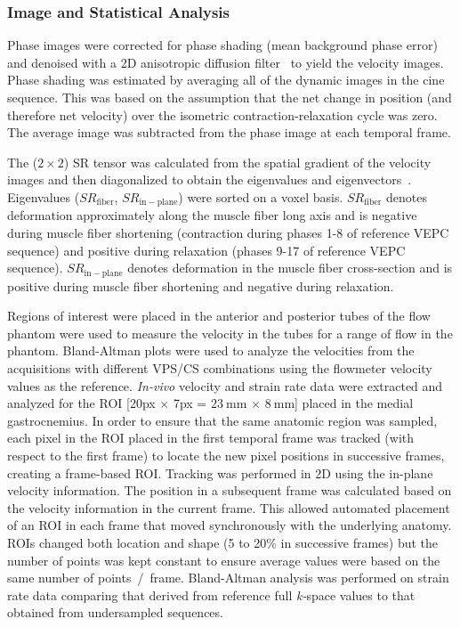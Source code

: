 \subsubsection{Image and Statistical Analysis}
Phase images were corrected for phase shading (mean background phase error) and denoised with a 2D anisotropic diffusion filter~\cite{RNCS17} to yield the velocity images. 
Phase shading was estimated by averaging all of the dynamic images in the cine sequence. 
This was based on the assumption that the net change in position (and therefore net velocity) over the isometric contraction-relaxation cycle was zero. 
The average image was subtracted from the phase image at each temporal frame. 

The ($2 \times 2$) SR tensor was calculated from the spatial gradient of the velocity images and then diagonalized to obtain the eigenvalues and eigenvectors~\cite{RNS16, Malis:2018fr}. 
Eigenvalues ($SR_{\mathrm{fiber}}$, $SR_{\mathrm{in-plane}}$) were sorted on a voxel basis. 
$SR_{\mathrm{fiber}}$ denotes deformation approximately along the muscle fiber long axis and is negative during muscle fiber shortening (contraction during phases 1-8 of reference VEPC sequence) and positive during relaxation (phases 9-17 of reference VEPC sequence). 
$SR_{\mathrm{in-plane}}$ denotes deformation in the muscle fiber cross-section and is positive during muscle fiber shortening and negative during relaxation.

Regions of interest were placed in the anterior and posterior tubes of the flow phantom were used to measure the velocity in the tubes for a range of flow in the phantom. 
Bland-Altman plots were used to analyze the velocities from the acquisitions with different VPS/CS combinations using the flowmeter velocity values as the reference. 
\textit{In-vivo} velocity and strain rate data were extracted and analyzed for the ROI [20px $\times$ 7px = $\SI{23}{\milli\meter}$ $\times$ $\SI{8}{\milli\meter}$] placed in the medial gastrocnemius. 
In order to ensure that the same anatomic region was sampled, each pixel in the ROI placed in the first temporal frame was tracked (with respect to the first frame) to locate the new pixel positions in successive frames, creating a frame-based ROI. 
Tracking was performed in 2D using the in-plane velocity information. 
The position in a subsequent frame was calculated based on the velocity information in the current frame. 
This allowed automated placement of an ROI in each frame that moved synchronously with the underlying anatomy. 
ROIs changed both location and shape (5 to 20\% in successive frames) but the number of points was kept constant to ensure average values were based on the same number of points~/~frame. 
Bland-Altman analysis was performed on strain rate data comparing that derived from reference full \mbox{\textit{k-}space} values to that obtained from undersampled sequences.
